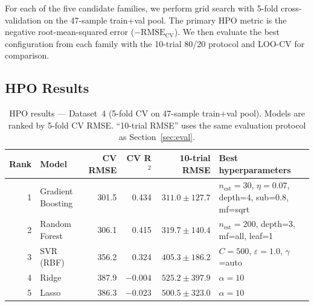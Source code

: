 \documentclass[12pt,a4paper]{article}
\begin{document}
For each of the five candidate families, we perform grid search with
5-fold cross-validation on the 47-sample train+val pool.  The primary
HPO metric is the negative root-mean-squared error
($-\text{RMSE}_\text{CV}$).  We then evaluate the best configuration
from each family with the 10-trial 80/20 protocol and LOO-CV for
comparison.

\subsection{HPO Results}

\begin{table}[h]
\centering
\caption{HPO results — Dataset~4 (5-fold CV on 47-sample train+val pool).
  Models are ranked by 5-fold CV RMSE.  ``10-trial RMSE'' uses the
  same evaluation protocol as Section~\ref{sec:eval}.}
\label{tab:ds4_hpo}
\small
\begin{tabular}{rlrrrp{5cm}}
\toprule
Rank & Model & CV RMSE & CV R$^2$ & 10-trial RMSE & Best hyperparameters \\
\midrule
1 & Gradient Boosting & 301.5 & 0.434 & $311.0 \pm 127.7$ &
  $n_\text{est}=30$, $\eta=0.07$, depth=4, sub=0.8, mf=sqrt \\
2 & Random Forest & 306.1 & 0.415 & $319.7 \pm 140.4$ &
  $n_\text{est}=200$, depth=3, mf=all, leaf=1 \\
3 & SVR (RBF) & 356.2 & 0.324 & $405.3 \pm 186.2$ &
  $C=500$, $\varepsilon=1.0$, $\gamma$=auto \\
4 & Ridge & 387.9 & $-0.004$ & $525.2 \pm 397.9$ &
  $\alpha=10$ \\
5 & Lasso & 386.3 & $-0.023$ & $500.5 \pm 323.0$ &
  $\alpha=10$ \\
\bottomrule
\end{tabular}
\end{table}
\end{document}
